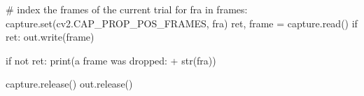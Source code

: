 \documentclass[
  letterpaper,
  DIV=11,
  numbers=noendperiod]{scrreprt}
\newenvironment{Shaded}{\begin{snugshade}}{\end{snugshade}}
\newcommand{\BuiltInTok}[1]{\textcolor[rgb]{0.00,0.23,0.31}{#1}}
\newcommand{\CommentTok}[1]{\textcolor[rgb]{0.37,0.37,0.37}{#1}}
\newcommand{\ControlFlowTok}[1]{\textcolor[rgb]{0.00,0.23,0.31}{#1}}
\newcommand{\KeywordTok}[1]{\textcolor[rgb]{0.00,0.23,0.31}{#1}}
\newcommand{\NormalTok}[1]{\textcolor[rgb]{0.00,0.23,0.31}{#1}}
\newcommand{\OperatorTok}[1]{\textcolor[rgb]{0.37,0.37,0.37}{#1}}
\newcommand{\StringTok}[1]{\textcolor[rgb]{0.13,0.47,0.30}{#1}}
\begin{document}
\begin{Shaded}
\begin{Highlighting}[]
    \CommentTok{\# index the frames of the current trial }
    \ControlFlowTok{for}\NormalTok{ fra }\KeywordTok{in}\NormalTok{ frames:}
\NormalTok{        capture.}\BuiltInTok{set}\NormalTok{(cv2.CAP\_PROP\_POS\_FRAMES, fra)}
\NormalTok{        ret, frame }\OperatorTok{=}\NormalTok{ capture.read()}
        \ControlFlowTok{if}\NormalTok{ ret:}
\NormalTok{            out.write(frame)}
            
        \ControlFlowTok{if} \KeywordTok{not}\NormalTok{ ret:}
            \BuiltInTok{print}\NormalTok{(}\StringTok{\textquotesingle{}a frame was dropped: \textquotesingle{}} \OperatorTok{+} \BuiltInTok{str}\NormalTok{(fra))}
        
\NormalTok{    capture.release()}
\NormalTok{    out.release()}
\end{Highlighting}
\end{Shaded}
\end{document}
